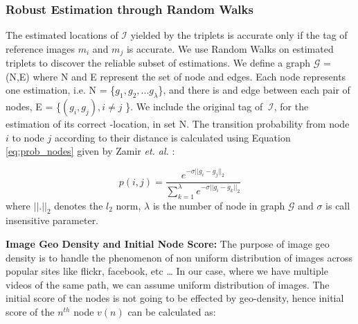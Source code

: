 \subsubsection{Robust Estimation through Random Walks}
The estimated \gps locations of $\mathcal{I}$ yielded by the triplets is accurate only if the \gps tag of reference images $m_i$ and $m_j$ is accurate. 
We use Random Walks on estimated triplets 
to discover the reliable subset of estimations. We define 
a graph $\mathcal{G}$ = (N,E) where N and E represent the 
set of node and edges. Each node represents one estimation, i.e. 
N = \{$g_1, g_2, ...g_\lambda$\}, and there is and edge between each 
pair of nodes, E = \{$(g_i , g_j ),i \neq j$ \}. We include the 
original \gps tag of $~\mathcal{I}$, for the estimation of its 
correct \gps-location, in set N. The transition probability from node $i$ to 
node $j$ according to their \gps distance is calculated using Equation 
\ref{eq:prob_nodes} given by Zamir {\em et. al.} \cite{Zamir_2014_CVPR}:

\begin{equation}
p(i,j)=\frac{e^{-\sigma||g_i-g_j||_2}}{\sum_{k=1}^{\lambda} e^{-\sigma||g_i-g_k||_2} }
\label{eq:prob_nodes}
\end{equation}
where $||.||_2$ denotes the $l_2$ norm, $\lambda$ is the number of node in 
graph $\mathcal{G}$ and $\sigma$ is call insensitive parameter.

\textbf{Image Geo Density and Initial Node Score:}
The purpose of image geo density is to handle the phenomenon
of non uniform distribution of images across popular sites
like flickr, facebook, etc \ldots
In our case, where we have multiple videos of the same path, we can 
assume uniform distribution of images. The initial score
of the nodes is not going to be effected by geo-density, hence
initial score of the $n^{th}$ node $v(n)$ can be calculated as:


